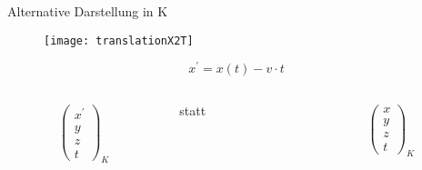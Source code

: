 \documentclass[]{beamer}%
\begin{document}
\begin{frame}{Alternative Darstellung in K}
    \begin{figure}[h]
        \centering
        \texttt{[image: translationX2T]}
    \end{figure}
    \begin{equation*}
        \boxed{
            x^\prime    = x(t) - v \cdot t
        }
    \end{equation*}
    \begin{columns}
        \begin{column}{0.1\textwidth}
            \begin{align*}
                \begin{pmatrix}
                    x^\prime\\y\\z\\t
                \end{pmatrix}_{K}
            \end{align*}
        \end{column}
        \begin{column}{0.1\textwidth}
            statt
        \end{column}
        \begin{column}{0.1\textwidth}
            \begin{align*}
                \begin{pmatrix}
                    x\\y\\z\\t
                \end{pmatrix}_{K}
            \end{align*}
        \end{column}
    \end{columns}
\end{frame}
\end{document}
